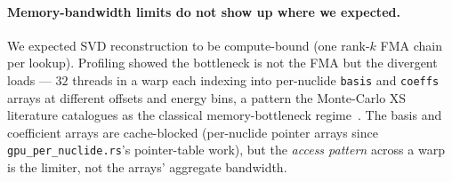 \paragraph{Memory-bandwidth limits do not show up where we expected.}
We expected SVD reconstruction to be compute-bound (one rank-$k$
FMA chain per lookup). Profiling showed the bottleneck is not
the FMA but the divergent loads --- $32$ threads in a warp each
indexing into per-nuclide \texttt{basis} and
\texttt{coeffs} arrays at different offsets and energy bins, a
pattern the Monte-Carlo XS literature catalogues as the
classical memory-bottleneck regime~\cite{tramm2014xsbench}.
The basis and coefficient arrays are cache-blocked (per-nuclide
pointer arrays since \texttt{gpu\_per\_nuclide.rs}'s pointer-table
work), but the \emph{access pattern} across a warp is the
limiter, not the arrays' aggregate bandwidth.
